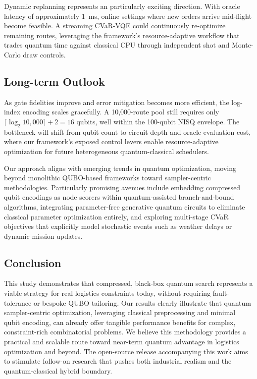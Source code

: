 Dynamic replanning represents an particularly exciting direction. With oracle latency of approximately 1~ms, online settings where new orders arrive mid-flight become feasible. A streaming CVaR-VQE could continuously re-optimize remaining routes, leveraging the framework's resource-adaptive workflow that trades quantum time against classical CPU through independent shot and Monte-Carlo draw controls.

\subsection{Long-term Outlook}

As gate fidelities improve and error mitigation becomes more efficient, the log-index encoding scales gracefully. A 10,000-route pool still requires only $\lceil\log_2 10,000\rceil + 2 = 16$ qubits, well within the 100-qubit NISQ envelope. The bottleneck will shift from qubit count to circuit depth and oracle evaluation cost, where our framework's exposed control levers enable resource-adaptive optimization for future heterogeneous quantum-classical schedulers.

Our approach aligns with emerging trends in quantum optimization, moving beyond monolithic QUBO-based frameworks toward sampler-centric methodologies. Particularly promising avenues include embedding compressed qubit encodings as node scorers within quantum-assisted branch-and-bound algorithms, integrating parameter-free generative quantum circuits to eliminate classical parameter optimization entirely, and exploring multi-stage CVaR objectives that explicitly model stochastic events such as weather delays or dynamic mission updates.

\subsection{Conclusion}

This study demonstrates that compressed, black-box quantum search represents a viable strategy for real logistics constraints today, without requiring fault-tolerance or bespoke QUBO tailoring. Our results clearly illustrate that quantum sampler-centric optimization, leveraging classical preprocessing and minimal qubit encoding, can already offer tangible performance benefits for complex, constraint-rich combinatorial problems. We believe this methodology provides a practical and scalable route toward near-term quantum advantage in logistics optimization and beyond. The open-source release accompanying this work aims to stimulate follow-on research that pushes both industrial realism and the quantum-classical hybrid boundary.